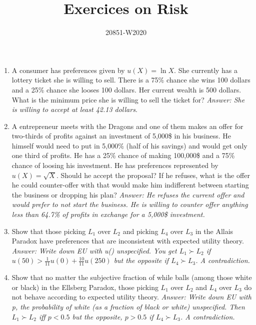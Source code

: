 \documentclass[11pt, oneside,french]{article}   	%
\title{Exercices on Risk}
\author{20851-W2020}
\date{}							%
\begin{document}
\maketitle

\begin{enumerate}
    \item A consumer has preferences given by $u(X) = \ln X$. She currently has a lottery ticket she is willing to sell. There is a 75\% chance she wins 100 dollars and a 25\% chance she looses 100 dollars. Her current wealth is 500 dollars. What is the minimum price she is willing to sell the ticket for? \textit{Answer: She is willing to accept at least 42.13 dollars}. 
    \item A entrepreneur meets with the Dragons and one of them makes an offer for two-thirds of profits against an investment of 5,000\$ in his business. He himself would need to put in 5,000\% (half of his savings) and would get only one third of profits. He has a 25\% chance of making 100,000\$ and a 75\% chance of loosing his investment. He has preferences represented by $u(X) = \sqrt{X}$. Should he accept the proposal? If he refuses, what is the offer he could counter-offer with that would make him indifferent between starting the business or dropping his plan? \textit{Answer: He refuses the current offer and would prefer to not start the business. He is willing to counter offer anything less than 64.7\% of profits in exchange for a 5,000\$ investment.} 
    \item Show that those picking $L_1$ over $L_2$ and picking $L_4$ over $L_3$ in the Allais Paradox have preferences that are inconsistent with expected utility theory. \textit{Answer: Write down EU with u() unspecified. You get $L_1 \succ L_2$ if $u(50)>\frac{1}{11}u(0) + \frac{10}{11}u(250)$ but the opposite if $L_4 \succ L_3$. A contradiction.}
    \item Show that no matter the subjective fraction of while balls (among those white or black) in the Ellsberg Paradox, those picking $L_1$ over $L_2$ and $L_4$ over $L_3$ do not behave according to expected utility theory. \textit{Answer: Write down EU with p, the probability of white (as a fraction of black or white) unspecified. Then $L_1 \succ L_2$ iff $p<0.5$ but the opposite, $p>0.5$ if $L_4 \succ L_3$. A contradiction.}

\end{enumerate}
\end{document}

